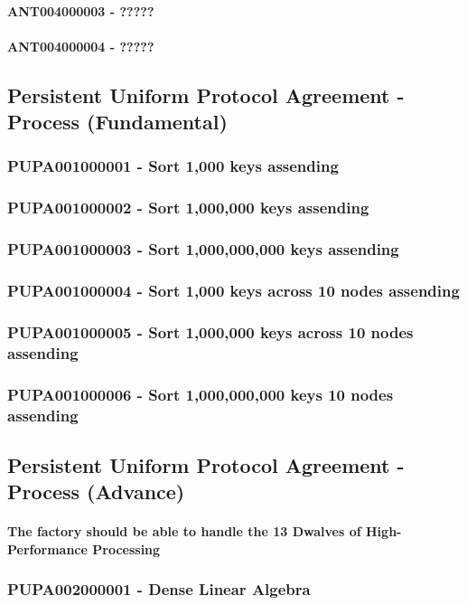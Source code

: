 \documentclass{acm_proc_article-sp}
\begin{document}
\paragraph{ANT004000003 - ?????}
\paragraph{ANT004000004 - ?????}
\subsection{Persistent Uniform Protocol Agreement - Process (Fundamental)}
\subsubsection{PUPA001000001 - Sort 1,000 keys assending}
\subsubsection{PUPA001000002 - Sort 1,000,000 keys assending}
\subsubsection{PUPA001000003 - Sort 1,000,000,000 keys assending}
\subsubsection{PUPA001000004 - Sort 1,000 keys across 10 nodes assending}
\subsubsection{PUPA001000005 - Sort 1,000,000 keys across 10 nodes assending}
\subsubsection{PUPA001000006 - Sort 1,000,000,000 keys 10 nodes assending}
\subsection{Persistent Uniform Protocol Agreement - Process (Advance)}
\paragraph{ The factory should be able to handle the 13 Dwalves of High-Performance Processing \cite{asanovic2006landscape}}
\subsubsection{PUPA002000001 - Dense Linear Algebra}
\end{document}
